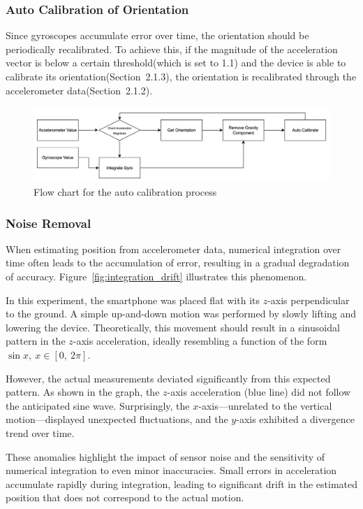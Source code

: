 \documentclass{article}
\begin{document}
\FloatBarrier
\subsubsection{Auto Calibration of Orientation}
Since gyroscopes accumulate error over time, the orientation should be periodically recalibrated.
To achieve this, if the magnitude of the acceleration vector is below a certain threshold(which is set to 1.1) and the device is able to calibrate its orientation(Section~2.1.3), the orientation is recalibrated through the accelerometer data(Section~2.1.2).

\FloatBarrier
\begin{figure}[h]
    \centering
    \includegraphics[width=\textwidth]{auto_calibration_flow_chart.png}
    \caption{Flow chart for the auto calibration process}
    \label{fig:auto_calibration_flow_chart}
\end{figure}

\FloatBarrier
\subsubsection{Noise Removal}
When estimating position from accelerometer data, numerical integration over time often leads to the accumulation of error, resulting in a gradual degradation of accuracy. Figure~\ref{fig:integration_drift} illustrates this phenomenon.

In this experiment, the smartphone was placed flat with its $z$-axis perpendicular to the ground. A simple up-and-down motion was performed by slowly lifting and lowering the device. Theoretically, this movement should result in a sinusoidal pattern in the $z$-axis acceleration, ideally resembling a function of the form $\sin x,\ x \in [0,\ 2\pi]$.

However, the actual measurements deviated significantly from this expected pattern. As shown in the graph, the $z$-axis acceleration (blue line) did not follow the anticipated sine wave. Surprisingly, the $x$-axis—unrelated to the vertical motion—displayed unexpected fluctuations, and the $y$-axis exhibited a divergence trend over time.

These anomalies highlight the impact of sensor noise and the sensitivity of numerical integration to even minor inaccuracies. Small errors in acceleration accumulate rapidly during integration, leading to significant drift in the estimated position that does not correspond to the actual motion.
\end{document}
